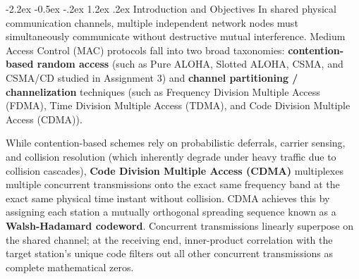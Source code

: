 \documentclass[11pt,a4paper]{article}
\makeatletter
\renewcommand\section{\@startsection {section}{1}{\z@}%
                                   {-2.2ex \@plus -0.5ex \@minus -.2ex}%
                                   {1.2ex \@plus.2ex}%
                                   {\normalfont\Large\bfseries}}
\makeatother
\begin{document}
\section{Introduction and Objectives}
In shared physical communication channels, multiple independent network nodes must simultaneously communicate without destructive mutual interference. Medium Access Control (MAC) protocols fall into two broad taxonomies: \textbf{contention-based random access} (such as Pure ALOHA, Slotted ALOHA, CSMA, and CSMA/CD studied in Assignment 3) and \textbf{channel partitioning / channelization} techniques (such as Frequency Division Multiple Access (FDMA), Time Division Multiple Access (TDMA), and Code Division Multiple Access (CDMA)).

While contention-based schemes rely on probabilistic deferrals, carrier sensing, and collision resolution (which inherently degrade under heavy traffic due to collision cascades), \textbf{Code Division Multiple Access (CDMA)} multiplexes multiple concurrent transmissions onto the exact same frequency band at the exact same physical time instant without collision. CDMA achieves this by assigning each station a mutually orthogonal spreading sequence known as a \textbf{Walsh-Hadamard codeword}. Concurrent transmissions linearly superpose on the shared channel; at the receiving end, inner-product correlation with the target station's unique code filters out all other concurrent transmissions as complete mathematical zeros.
\end{document}
